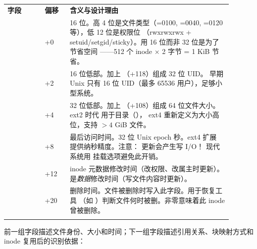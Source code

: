 \begin{filesystemlayout}

\begin{longtable}{|F{0.15\linewidth}|F{0.10\linewidth}|F{0.65\linewidth}|}
\hline
{}
\textbf{字段} & \textbf{偏移} & \textbf{含义与设计理由} \\\tablerowrule
\endhead
{} & +0 & 16 位。高 4 位是文件类型（=0100,
=0040, =0120 等），低 12 位是权限位
（rwxrwxrwx + setuid/setgid/sticky）。用 16 位而非 32 位是为了节省空间
——512 个 inode $\times$ 2 字节 = 1 KiB 节省。 \\\tablerowrule
{} & +2 & 16 位低部。加上 （+118）组成 32 位 UID。
早期 Unix 只有 16 位 UID（最多 65536 用户），足够小型系统。 \\\tablerowrule
{} & +4 & 32 位低部。加上 （+108）组成
64 位文件大小。ext2 时代  用于目录（），
ext4 重新定义为大小高位，支持 $> 4$ GiB 文件。 \\\tablerowrule
{} & +8 & 最后访问时间。32 位 Unix epoch 秒。ext4 扩展
 提供纳秒精度。注意： 更新会产生写 I/O！
现代系统用  挂载选项避免此开销。 \\\tablerowrule
{} & +12 & inode 元数据修改时间（改权限、改属主时更新）。
 是\emph{数据}修改时间（写文件内容时更新）。 \\\tablerowrule
{} & +20 & 删除时间。文件被删除时写入此字段。用于恢复工具
（如 ）判断文件何时被删。非零意味着此 inode 曾被删除。 \\\tablerowrule
\end{longtable}

前一组字段描述文件身份、大小和时间；下一组字段描述引用关系、块映射方式和 inode 复用后的识别依据：


\end{filesystemlayout}
